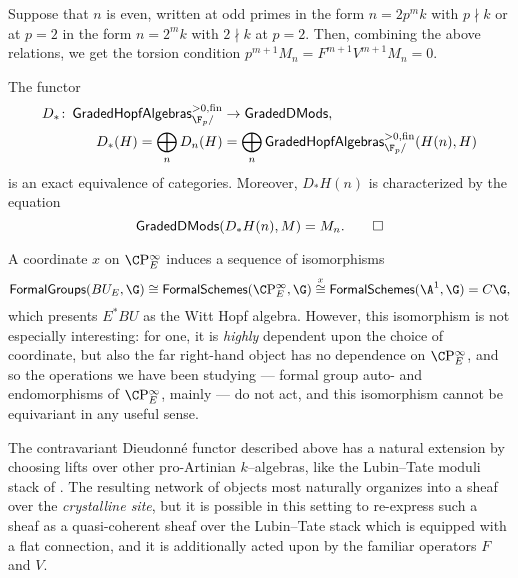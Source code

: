 \begin{remark}
Suppose that $n$ is even, written at odd primes in the form $n = 2p^m k$ with $p \nmid k$ or at $p = 2$ in the form $n = 2^m k$ with $2 \nmid k$ at $p = 2$.  Then, combining the above relations, we get the torsion condition $p^{m+1} M_n = F^{m+1} V^{m+1} M_n = 0$.
\end{remark}

\begin{theorem}
The functor
\begin{align*}
D_*\co \CatOf{GradedHopfAlgebras}^{>0, \fin}_{\F_p/} & \to \CatOf{GradedDMods}, \\
D_*(H) = \bigoplus_n D_n(H) & = \bigoplus_n \CatOf{GradedHopfAlgebras}^{>0, \fin}_{\F_p/}(H(n), H)
\end{align*}
is an exact equivalence of categories.  Moreover, $D_* H(n)$ is characterized by the equation \[\mathsf{GradedDMods}(D_* H(n), M) = M_n. \qed\]
\end{theorem}







\begin{remark}
A coordinate $x$ on $\CP^\infty_E$ induces a sequence of isomorphisms \[\CatOf{FormalGroups}(BU_E, \G) \cong \CatOf{FormalSchemes}(\CP^\infty_E, \G) \stackrel{x}{\cong} \CatOf{FormalSchemes}(\A^1, \G) = C\G,\] which presents $E^* BU$ as the Witt Hopf algebra.  However, this isomorphism is not especially interesting: for one, it is \emph{highly} dependent upon the choice of coordinate, but also the far right-hand object has no dependence on $\CP^\infty_E$, and so the operations we have been studying --- formal group auto- and endomorphisms of $\CP^\infty_E$, mainly --- do not act, and this isomorphism cannot be equivariant in any useful sense.
\end{remark}

\begin{remark}
The contravariant Dieudonn\'e functor described above has a natural extension by choosing lifts over other pro-Artinian $k$--algebras, like the Lubin--Tate moduli stack of .  The resulting network of objects most naturally organizes into a sheaf over the \textit{crystalline site}, but it is possible in this setting to re-express such a sheaf as a quasi-coherent sheaf over the Lubin--Tate stack which is equipped with a flat connection, and it is additionally acted upon by the familiar operators $F$ and $V$.
\end{remark}

